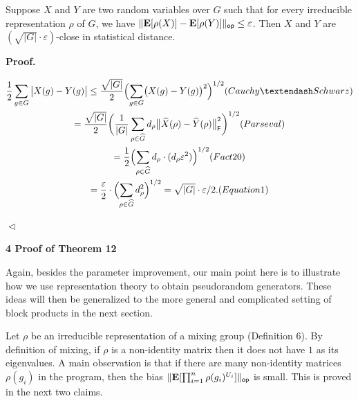 Suppose $X$ and $Y$ are two random variables over $G$ such that for every irreducible representation $\rho$ of $G$, we have $\lVert\mathop{\bf E\/}[\rho(X)]-\mathop{\bf E\/}[\rho(Y)]\rVert_{\mathsf{op}}\leq\varepsilon$.
Then $X$ and $Y$ are $(\sqrt{\lvert G\rvert}\cdot\varepsilon)$-close in statistical distance.\par







\par\medskip\noindent\textbf{
\textbf{Proof}.}\par




\[\begin{gathered}
\displaystyle\frac{1}{2}\sum_{g\in G}\big{\lvert}X(g)-Y(g)\big{\rvert} \displaystyle\leq\frac{\sqrt{\lvert G\rvert}}{2}\Bigl{(}\sum_{g\in G}\bigl{(}X(g)-Y(g)\bigr{)}^{2}\Bigr{)}^{1/2} (Cauchy–Schwarz) \\
\displaystyle=\frac{\sqrt{\lvert G\rvert}}{2}\biggl{(}\frac{1}{\lvert G\rvert}\sum_{\rho\in\widehat{G}}d_{\rho}\big{\lVert}\widehat{X}(\rho)-\widehat{Y}(\rho)\big{\rVert}_{\mathsf{F}}^{2}\biggr{)}^{1/2} (Parseval) \\
\displaystyle=\frac{1}{2}\Bigl{(}\sum_{\rho\in\widehat{G}}d_{\rho}\cdot(d_{\rho}\varepsilon^{2})\Bigr{)}^{1/2} (Fact 20) \\
\displaystyle=\frac{\varepsilon}{2}\cdot\Bigl{(}\sum_{\rho\in\widehat{G}}d_{\rho}^{2}\Bigr{)}^{1/2}=\sqrt{\lvert G\rvert}\cdot\varepsilon/2. (Equation 1)
\end{gathered}\]


$\vartriangleleft$\par






\par\medskip\noindent\textbf{
4 Proof of Theorem 12
}\par




Again, besides the parameter improvement, our main point here is to illustrate how we use representation theory to obtain pseudorandom generators. These ideas will then be generalized to the more general and complicated setting of block products in the next section.\par




Let $\rho$ be an irreducible representation of a mixing group (Definition 6).
By definition of mixing, if $\rho$ is a non-identity matrix then it does not have $1$ as its eigenvalues.
A main observation is that if there are many non-identity matrices $\rho(g_{i})$ in the program, then the bias $\lVert\mathop{\bf E\/}[\prod_{i=1}^{n}\rho(g_{i})^{U_{i}}]\rVert_{\mathsf{op}}$ is small. This is proved in the next two claims.\par



